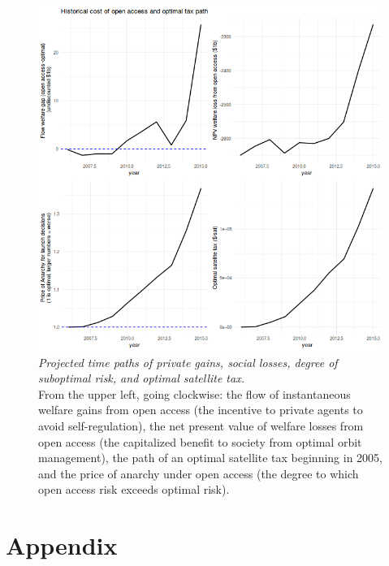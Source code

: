 \documentclass[12pt]{article}
\begin{document}
\begin{figure}[H]
	\centering
	\includegraphics[width=\textwidth]{../../images/32_pt_opt_simulated_historical_cost_tax.png}
	\captionsetup{format=hang}
	\caption{\textit{Projected time paths of private gains, social losses, degree of suboptimal risk, and optimal satellite tax.} \\
		From the upper left, going clockwise: the flow of instantaneous welfare gains from open access (the incentive to private agents to avoid self-regulation), the net present value of welfare losses from open access (the capitalized benefit to society from optimal orbit management), the path of an optimal satellite tax beginning in 2005, and the price of anarchy under open access (the degree to which open access risk exceeds optimal risk).
	}
	\label{projected_tax_path}
\end{figure}

\newpage

{
	\setlength{\bibsep}{3pt}
	
	
}

\newpage

\section{Appendix}
\end{document}
